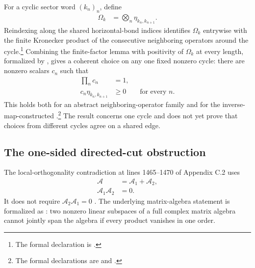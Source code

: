 \documentclass{article}
\begin{document}
For a cyclic sector word $(k_n)_n$, define
\begin{align}
    \Omega_k
        &=
        \bigotimes_n\eta_{k_n,k_{n+1}}.
    \label{eq:cpgsv17_mpdo_sal_zcl_eta_local_structure_cyclic_neighbor_product}
\end{align}
Reindexing along the shared horizontal-bond indices identifies $\Omega_k$
entrywise with the finite Kronecker product of the consecutive neighboring
operators around the cycle.\footnote{The formal declaration is
.}
Combining the finite-factor lemma with positivity of $\Omega_k$ at every
length, formalized by
, gives a coherent choice
on any one fixed nonzero cycle: there are nonzero scalars $c_n$ such that
\begin{align}
    \prod_n c_n
        &=1,
    \label{eq:cpgsv17_mpdo_sal_zcl_eta_local_structure_cycle_scalar_product}\\
    c_n\eta_{k_n,k_{n+1}}
        &\geq 0
        \qquad\text{for every }n.
    \label{eq:cpgsv17_mpdo_sal_zcl_eta_local_structure_cycle_edges_positive}
\end{align}
This holds both for an abstract neighboring-operator family and for the
inverse-map-constructed .\footnote{The formal
declarations are
and
.}
The result concerns one cycle and does not yet prove that choices from
different cycles agree on a shared edge.

\subsection{The one-sided directed-cut obstruction}

The local-orthogonality contradiction at lines 1465--1470 of Appendix C.2
uses
\begin{align}
    \mathcal A
        &=
        \mathcal A_1+\mathcal A_2,
    \label{eq:cpgsv17_mpdo_sal_zcl_eta_local_structure_subspace_decomposition}\\
    \mathcal A_1\mathcal A_2
        &=0.
    \label{eq:cpgsv17_mpdo_sal_zcl_eta_local_structure_one_sided_product_zero}
\end{align}
It does not require $\mathcal A_2\mathcal A_1=0$
\cite{Cirac2016MPDO_arXiv}. The underlying matrix-algebra statement is
formalized as : two nonzero
linear subspaces of a full complex matrix algebra cannot jointly span the
algebra if every product vanishes in one order.
\end{document}
